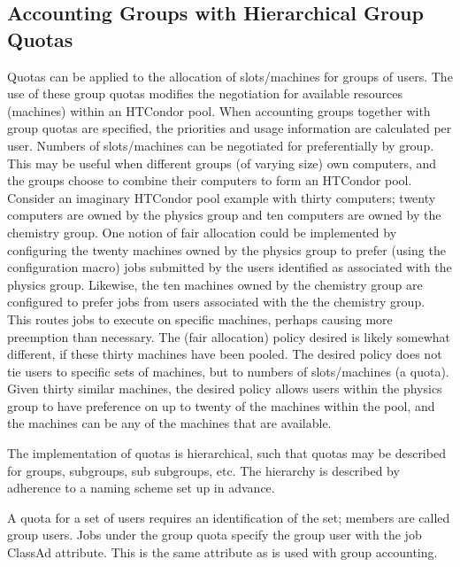 \subsection{\label{sec:group-quotas}Accounting Groups with Hierarchical Group Quotas}

Quotas can be applied to the allocation of slots/machines
for groups of users.
The use of these group quotas modifies the negotiation for 
available resources (machines) within an HTCondor pool.
When accounting groups together with group quotas are specified,
the priorities and usage information are calculated per user.
Numbers of slots/machines can be negotiated for preferentially
by group.
This may be useful when
different groups (of varying size) own computers,
and the groups choose to combine their computers to
form an HTCondor pool.
Consider an imaginary HTCondor pool example with thirty computers;
twenty computers are owned by the physics group and ten
computers are owned by the chemistry group.
One notion of fair allocation could be implemented 
by configuring the twenty machines owned by the physics group
to prefer (using the  configuration macro)
jobs submitted by the users identified as associated
with the physics group.
Likewise, the ten machines owned by the chemistry group are
configured to prefer jobs from users associated with the
the chemistry group.
This routes jobs to execute on specific machines,
perhaps causing more preemption than necessary.
The (fair allocation) policy desired is likely somewhat different,
if these thirty machines have been pooled.
The desired policy does not tie users to specific sets of machines,
but to numbers of slots/machines (a quota).
Given thirty similar machines,
the desired policy allows users within the physics group to have
preference on up to twenty of the machines within the pool,
and the machines can be any of the machines that are available.

The implementation of quotas is hierarchical,
such that quotas may be described for groups, subgroups,
sub subgroups, etc.  
The hierarchy is described by adherence to a naming scheme
set up in advance.

A quota for a set of users requires an identification of
the set; members are called group users.
Jobs under the group quota specify the group user with the
 job ClassAd attribute.
This is the same attribute as is used with group accounting.

